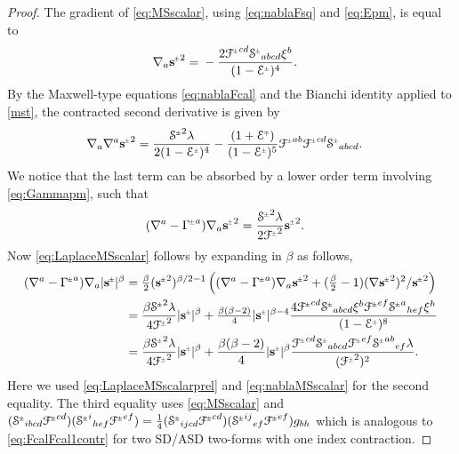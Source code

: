 \documentclass[a4paper,10pt,reqno]{amsart}
\newcommand{\Scal}{\mathop{\rm Scal}}
\theoremstyle{plain}
\newcommand{\PM}[1]{{{#1}^{\hspace{-.5pt}\scaleto{\pm}{3.5pt}}}}
\newcommand{\MP}[1]{{{#1}^{\hspace{-.5pt}\scaleto{\mp}{3.5pt}}}}
\def\Fcal{\mathcal{F}}
\def\Ecal{\mathcal{E}}
\def\Scal{\mathcal{S}}
\def\sbold{\mathbf{s}}
\numberwithin{equation}{section}
\begin{document}
\begin{proof}
The gradient of \eqref{eq:MSscalar}, using \eqref{eq:nablaFsq} and \eqref{eq:Epm}, is equal to
\begin{align} \label{eq:nablaMSscalar}
\nabla_{a}\PM{\sbold}^2 ={}& - \frac{2 \PM{\Fcal}^{cd} \PM{\Scal}_{abcd} \xi^{b}}{(1 - \PM{\Ecal})^4}.
\end{align}
 By the Maxwell-type equations \eqref{eq:nablaFcal} and the Bianchi identity
applied to \eqref{mst}, the contracted second derivative is given by 
\begin{align}\label{eq:MSid}
\nabla_{a}\nabla^{a}\PM{\sbold}^2={}& \frac{ \PM{\Scal}^2 \lambda}{2 (1 - \PM{\Ecal})^4} - \frac{ (1 +  \MP{\Ecal})}{ (1 - \PM{\Ecal})^5} \PM{\Fcal}^{ab} \PM{\Fcal}^{cd} \PM{\Scal}_{abcd}.
\end{align}
We notice that the last term can be absorbed by a lower order term involving \eqref{eq:Gammapm}, such that
\begin{align} \label{eq:LaplaceMSscalarprel}
(\nabla^{a} - \PM{\Gamma}^{a}) \nabla_{a}\PM{\sbold}^2 ={}&\frac{\PM{\Scal}^2 \lambda}{2 \PM{\Fcal}^2} \PM{\sbold}^2.
\end{align}
Now \eqref{eq:LaplaceMSscalar} follows by expanding in $\beta$ as follows,
\begin{align} 
(\nabla^{a} - \PM{\Gamma}^{a}) \nabla_{a}|\PM{\sbold}|^\beta 
={}& 
\tfrac{\beta}{2} (\PM{\sbold}^2)^{\beta/2-1} \left((\nabla^{a} - \PM{\Gamma}^{a}) \nabla_{a}\PM{\sbold}^2 + (\tfrac{\beta}{2} - 1)   (\nabla\PM{\sbold}^2 )^2 / \PM{\sbold}^{2}\right) \nonumber \\
={}& 
\frac{\beta \PM{\Scal}^2 \lambda}{4 \PM{\Fcal}^2} |\PM{\sbold}|^\beta + \tfrac{\beta(\beta-2)}{4} |\PM{\sbold}|^{\beta-4} \frac{4 \PM{\Fcal}^{cd} \PM{\Scal}_{abcd} \xi^{b}\PM{\Fcal}^{ef} \PM{\Scal}^a{}_{hef} \xi^{h}}{(1 - \PM{\Ecal})^8} \nonumber \\
={}& 
\frac{\beta \PM{\Scal}^2 \lambda}{4 \PM{\Fcal}^2} |\PM{\sbold}|^\beta + 
\frac{\beta(\beta-2)}{4} |\PM{\sbold}|^{\beta} \frac{ \PM{\Fcal}^{cd} \PM{\Scal}_{abcd} \PM{\Fcal}^{ef} \PM{\Scal}^{ab}{}_{ef} \lambda}{(\PM{\Fcal}^2)^2} .
\end{align}
Here we used \eqref{eq:LaplaceMSscalarprel} and \eqref{eq:nablaMSscalar} for the second equality. The third equality uses \eqref{eq:MSscalar} and
$ (\PM{\Scal}_{ibcd}\PM{\Fcal}^{cd}) (\PM{\Scal}^i{}_{hef}\PM{\Fcal}^{ef}) = \frac{1}{4} (\PM{\Scal}_{ijcd}\PM{\Fcal}^{cd} )(  \PM{\Scal}^{ij}{}_{ef}\PM{\Fcal}^{ef}) g_{bh}$ which is analogous to \eqref{eq:FcalFcal1contr} for two SD/ASD two-forms with one index contraction.
\end{proof}
\end{document}
